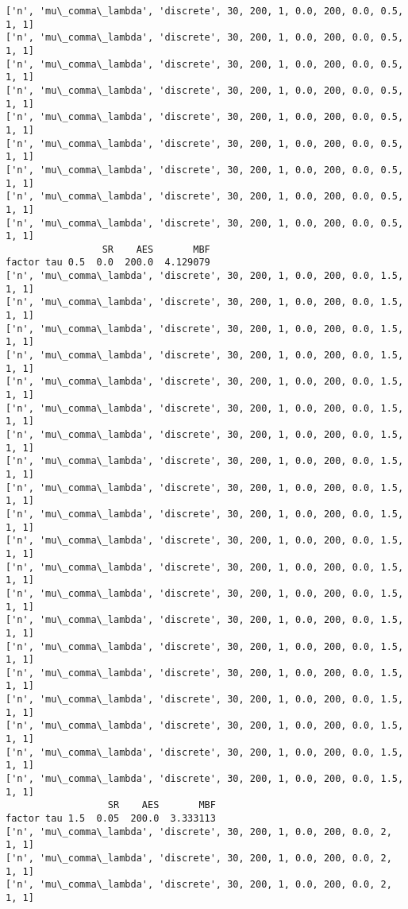 \documentclass[11pt]{article}
\begin{document}
\begin{Verbatim}[commandchars=\\\{\}]
['n', 'mu\_comma\_lambda', 'discrete', 30, 200, 1, 0.0, 200, 0.0, 0.5, 1, 1]
['n', 'mu\_comma\_lambda', 'discrete', 30, 200, 1, 0.0, 200, 0.0, 0.5, 1, 1]
['n', 'mu\_comma\_lambda', 'discrete', 30, 200, 1, 0.0, 200, 0.0, 0.5, 1, 1]
['n', 'mu\_comma\_lambda', 'discrete', 30, 200, 1, 0.0, 200, 0.0, 0.5, 1, 1]
['n', 'mu\_comma\_lambda', 'discrete', 30, 200, 1, 0.0, 200, 0.0, 0.5, 1, 1]
['n', 'mu\_comma\_lambda', 'discrete', 30, 200, 1, 0.0, 200, 0.0, 0.5, 1, 1]
['n', 'mu\_comma\_lambda', 'discrete', 30, 200, 1, 0.0, 200, 0.0, 0.5, 1, 1]
['n', 'mu\_comma\_lambda', 'discrete', 30, 200, 1, 0.0, 200, 0.0, 0.5, 1, 1]
['n', 'mu\_comma\_lambda', 'discrete', 30, 200, 1, 0.0, 200, 0.0, 0.5, 1, 1]
                 SR    AES       MBF
factor tau 0.5  0.0  200.0  4.129079
['n', 'mu\_comma\_lambda', 'discrete', 30, 200, 1, 0.0, 200, 0.0, 1.5, 1, 1]
['n', 'mu\_comma\_lambda', 'discrete', 30, 200, 1, 0.0, 200, 0.0, 1.5, 1, 1]
['n', 'mu\_comma\_lambda', 'discrete', 30, 200, 1, 0.0, 200, 0.0, 1.5, 1, 1]
['n', 'mu\_comma\_lambda', 'discrete', 30, 200, 1, 0.0, 200, 0.0, 1.5, 1, 1]
['n', 'mu\_comma\_lambda', 'discrete', 30, 200, 1, 0.0, 200, 0.0, 1.5, 1, 1]
['n', 'mu\_comma\_lambda', 'discrete', 30, 200, 1, 0.0, 200, 0.0, 1.5, 1, 1]
['n', 'mu\_comma\_lambda', 'discrete', 30, 200, 1, 0.0, 200, 0.0, 1.5, 1, 1]
['n', 'mu\_comma\_lambda', 'discrete', 30, 200, 1, 0.0, 200, 0.0, 1.5, 1, 1]
['n', 'mu\_comma\_lambda', 'discrete', 30, 200, 1, 0.0, 200, 0.0, 1.5, 1, 1]
['n', 'mu\_comma\_lambda', 'discrete', 30, 200, 1, 0.0, 200, 0.0, 1.5, 1, 1]
['n', 'mu\_comma\_lambda', 'discrete', 30, 200, 1, 0.0, 200, 0.0, 1.5, 1, 1]
['n', 'mu\_comma\_lambda', 'discrete', 30, 200, 1, 0.0, 200, 0.0, 1.5, 1, 1]
['n', 'mu\_comma\_lambda', 'discrete', 30, 200, 1, 0.0, 200, 0.0, 1.5, 1, 1]
['n', 'mu\_comma\_lambda', 'discrete', 30, 200, 1, 0.0, 200, 0.0, 1.5, 1, 1]
['n', 'mu\_comma\_lambda', 'discrete', 30, 200, 1, 0.0, 200, 0.0, 1.5, 1, 1]
['n', 'mu\_comma\_lambda', 'discrete', 30, 200, 1, 0.0, 200, 0.0, 1.5, 1, 1]
['n', 'mu\_comma\_lambda', 'discrete', 30, 200, 1, 0.0, 200, 0.0, 1.5, 1, 1]
['n', 'mu\_comma\_lambda', 'discrete', 30, 200, 1, 0.0, 200, 0.0, 1.5, 1, 1]
['n', 'mu\_comma\_lambda', 'discrete', 30, 200, 1, 0.0, 200, 0.0, 1.5, 1, 1]
['n', 'mu\_comma\_lambda', 'discrete', 30, 200, 1, 0.0, 200, 0.0, 1.5, 1, 1]
                  SR    AES       MBF
factor tau 1.5  0.05  200.0  3.333113
['n', 'mu\_comma\_lambda', 'discrete', 30, 200, 1, 0.0, 200, 0.0, 2, 1, 1]
['n', 'mu\_comma\_lambda', 'discrete', 30, 200, 1, 0.0, 200, 0.0, 2, 1, 1]
['n', 'mu\_comma\_lambda', 'discrete', 30, 200, 1, 0.0, 200, 0.0, 2, 1, 1]

\end{Verbatim}
\end{document}
